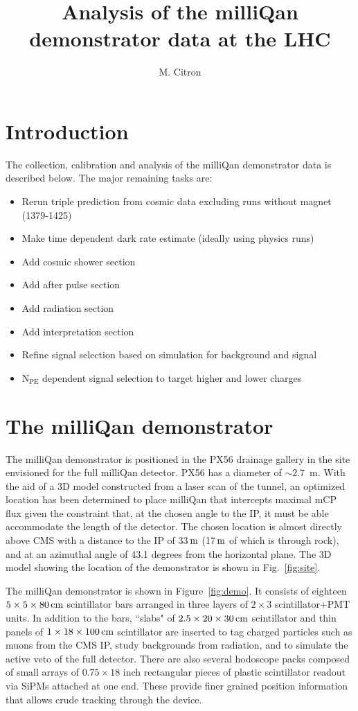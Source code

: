 \documentclass[12pt]{article}
\title{Analysis of the milliQan demonstrator data at the LHC}
\author{M. Citron}
\newcommand{\unit}[1]{\ensuremath{\text{\,#1}}\xspace}
\newcommand{\npe} {\mbox{\ensuremath{\textrm{N}_\textrm{PE}}}\xspace}
\begin{document}
\maketitle

\section{Introduction}

The collection, calibration and analysis of the milliQan demonstrator data is described below.
The major remaining tasks are:
\begin{itemize}
    \item Rerun triple prediction from cosmic data excluding runs without magnet (1379-1425)
    \item Make time dependent dark rate estimate (ideally using physics runs)
    \item Add cosmic shower section
    \item Add after pulse section
    \item Add radiation section
    \item Add interpretation section
    \item Refine signal selection based on simulation for background and signal
    \item \npe dependent signal selection to target higher and lower charges
\end{itemize}

\section{The milliQan demonstrator}

The milliQan demonstrator is positioned in the PX56 drainage gallery in
the site envisioned for the full milliQan detector. PX56 has a diameter of $\sim 2.7$~m. 
With the aid of a 3D model constructed from a laser scan of the tunnel, 
an optimized location has been determined to place milliQan 
that intercepts maximal mCP flux given the constraint that, at the 
chosen angle to the IP, it must be able accommodate the length of the detector. 
The chosen location is almost directly above CMS with a distance to the IP of 
33\unit{m} (17\unit{m} of which is through rock), and at an azimuthal angle of 
43.1 degrees from the horizontal plane. The 3D model showing the location 
of the demonstrator is shown in Fig.~\ref{fig:site}.

The milliQan demonstrator is shown in Figure~\ref{fig:demo}. It
consists of eighteen $5\times5\times80\unit{cm}$ scintillator bars arranged in three layers of 
$2\times3$ scintillator+PMT units. In addition to the bars, ``slabs" of $2.5 \times 20 \times 30\unit{cm}$ 
scintillator and thin panels of $1 \times 18 \times 100\unit{cm}$ scintillator are 
inserted to tag charged particles such as muons from the CMS IP, study backgrounds 
from radiation, and to simulate the active veto of the full detector. There are also 
several hodoscope packs composed of small arrays of $0.75 \times 18$ inch rectangular 
pieces of plastic scintillator readout via SiPMs attached at one end. These provide 
finer grained position information that allows crude tracking through the device. 
\end{document}
